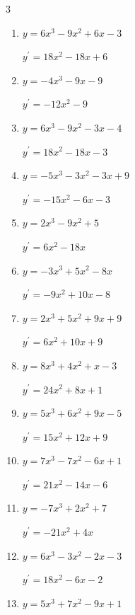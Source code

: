\begin{multicols}{3}
\begin{enumerate}
  \item $y=6x^{3}-9x^{2}+6x-3$

        $\displaystyle y^{\prime}=18x^{2}-18x+6$

  \item $y=-4x^{3}-9x-9$

        $\displaystyle y^{\prime}=-12x^{2}-9$

  \item $y=6x^{3}-9x^{2}-3x-4$

        $\displaystyle y^{\prime}=18x^{2}-18x-3$

  \item $y=-5x^{3}-3x^{2}-3x+9$

        $\displaystyle y^{\prime}=-15x^{2}-6x-3$

  \item $y=2x^{3}-9x^{2}+5$

        $\displaystyle y^{\prime}=6x^{2}-18x$

  \item $y=-3x^{3}+5x^{2}-8x$

        $\displaystyle y^{\prime}=-9x^{2}+10x-8$

  \item $y=2x^{3}+5x^{2}+9x+9$

        $\displaystyle y^{\prime}=6x^{2}+10x+9$

  \item $y=8x^{3}+4x^{2}+x-3$

        $\displaystyle y^{\prime}=24x^{2}+8x+1$

  \item $y=5x^{3}+6x^{2}+9x-5$

        $\displaystyle y^{\prime}=15x^{2}+12x+9$

  \item $y=7x^{3}-7x^{2}-6x+1$

        $\displaystyle y^{\prime}=21x^{2}-14x-6$

  \item $y=-7x^{3}+2x^{2}+7$

        $\displaystyle y^{\prime}=-21x^{2}+4x$

  \item $y=6x^{3}-3x^{2}-2x-3$

        $\displaystyle y^{\prime}=18x^{2}-6x-2$

\columnbreak %

\resetques

  \item $y=5x^{3}+7x^{2}-9x+1$


\end{enumerate}
\end{multicols}
